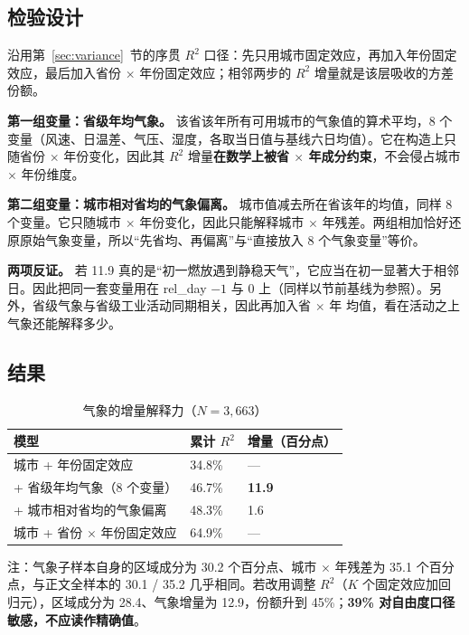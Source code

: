 \subsection{检验设计}

沿用第~\ref{sec:variance}~节的序贯 $R^2$ 口径：先只用城市固定效应，再加入年份固定效应，最后加入省份 $\times$ 年份固定效应；相邻两步的 $R^2$ 增量就是该层吸收的方差份额。

\textbf{第一组变量：省级年均气象。} 该省该年所有可用城市的气象值的算术平均，8 个变量（风速、日温差、气压、湿度，各取当日值与基线六日均值）。它在构造上只随省份 $\times$ 年份变化，因此其 $R^2$ 增量\textbf{在数学上被省 $\times$ 年成分约束}，不会侵占城市 $\times$ 年份维度。

\textbf{第二组变量：城市相对省均的气象偏离。} 城市值减去所在省该年的均值，同样 8 个变量。它只随城市 $\times$ 年份变化，因此只能解释城市 $\times$ 年残差。两组相加恰好还原原始气象变量，所以“先省均、再偏离”与“直接放入 8 个气象变量”等价。

\textbf{两项反证。} 若 11.9 真的是“初一燃放遇到静稳天气”，它应当在初一显著大于相邻日。因此把同一套变量用在 rel\_day $-1$ 与 $0$ 上（同样以节前基线为参照）。另外，省级气象与省级工业活动同期相关，因此再加入省 $\times$ 年 \NOtwo{} 均值，看在活动之上气象还能解释多少。

\subsection{结果}

\begin{table}[H]
\centering
\caption{气象的增量解释力（$N=3{,}663$）}
\label{tab:weather-r2}
\small
\begin{tabular}{L{5.6cm}R{2.2cm}R{2.8cm}}
\toprule
\textbf{模型} & \textbf{累计 $R^2$} & \textbf{增量（百分点）} \\
\midrule
城市 + 年份固定效应 & 34.8\% & — \\
\quad + 省级年均气象（8 个变量） & 46.7\% & \textbf{11.9} \\
\quad + 城市相对省均的气象偏离 & 48.3\% & 1.6 \\
\midrule
城市 + 省份 $\times$ 年份固定效应 & 64.9\% & — \\
\bottomrule
\end{tabular}

\vspace{0.3em}
{\small 注：气象子样本自身的区域成分为 30.2 个百分点、城市 $\times$ 年残差为 35.1 个百分点，与正文全样本的 30.1 / 35.2 几乎相同。若改用调整 $R^2$（$K$ 个固定效应加回归元），区域成分为 28.4、气象增量为 12.9，份额升到 45\%；\textbf{39\% 对自由度口径敏感，不应读作精确值}。}
\end{table}

